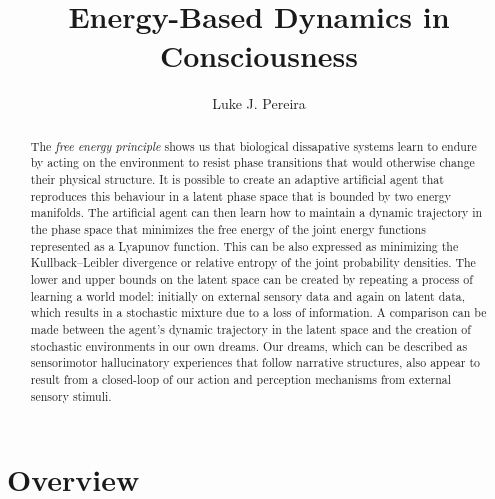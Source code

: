\documentclass{article}
\title{Energy-Based Dynamics in Consciousness}
\author{%
  Luke J. Pereira \\
}
\begin{document}
\maketitle

\begin{abstract}
The \textit{free energy principle} shows us that biological dissapative systems learn to endure by acting on the environment to resist phase transitions that would otherwise change their physical structure. It is possible to create an adaptive artificial agent that reproduces this behaviour in a latent phase space that is bounded by two energy manifolds. The artificial agent can then learn how to maintain a dynamic trajectory in the phase space that minimizes the free energy of the joint energy functions represented as a Lyapunov function. This can be also expressed as minimizing the Kullback–Leibler divergence or relative entropy of the joint probability densities. The lower and upper bounds on the latent space can be created by repeating a process of learning a world model: initially on external sensory data and again on latent data, which results in a stochastic mixture due to a loss of information. A comparison can be made between the agent's dynamic trajectory in the latent space and the creation of stochastic environments in our own dreams. Our dreams, which can be described as sensorimotor hallucinatory experiences that follow narrative structures, also appear to result from a closed-loop of our action and perception mechanisms from external sensory stimuli.
\end{abstract}

\begin{center}
    
\end{center}

\newpage

\section{Overview}
\end{document}
